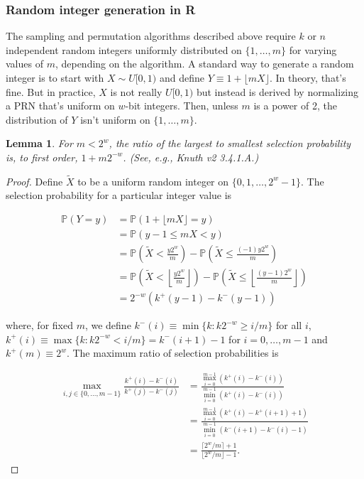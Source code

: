 \documentclass[12pt]{article}
\newtheorem{lemma}[theorem]{Lemma}
\newcommand{\todo}[1]{{\color{red}{TO DO: \sc #1}}}
\newcommand{\pr}{\mathbb{P}} %
\begin{document}
\subsubsection{Random integer generation in R}
The sampling and permutation algorithms described above require $k$ or $n$ independent random integers
uniformly distributed on $\{1, \dots, m\}$ for varying values of $m$, depending on the algorithm.
A standard way to generate a random integer is to start with $X \sim U[0,1)$ and define $Y \equiv 1 + \lfloor mX \rfloor$. 
In theory, that's fine. 
But in practice, $X$ is not really $U[0,1)$ but instead is derived by normalizing a PRN that's uniform on $w$-bit integers. 
Then, unless $m$ is a power of 2, the distribution of $Y$ isn't uniform on $\{1, \ldots, m\}$. 

\begin{lemma}
For $m < 2^w$, the ratio of the largest to smallest selection probability is, to first order,  $1+ m 2^{-w}$. (See, e.g., Knuth v2 3.4.1.A.)
\end{lemma}

\begin{proof}
Define $\tilde{X}$ to be a uniform random integer on $\{0, 1, \dots, 2^w - 1\}$.
The selection probability for a particular integer value is 

\begin{align*}
\pr\left(Y = y\right) &= \pr\left(1 + \lfloor mX \rfloor = y\right) \\
&= \pr\left(y-1 \leq mX < y\right) \\
&= \pr\left(\tilde{X} < \frac{y2^w}{m}\right) - \pr\left(\tilde{X} \leq \frac{(-1)y2^w}{m}\right)\\
&= \pr\left(\tilde{X} < \left\lfloor\frac{y2^w}{m}\right\rfloor\right) - \pr\left(\tilde{X} \leq \left\lfloor\frac{(y-1)2^w}{m}\right\rfloor\right)\\
&= 2^{-w}\left(k^+(y-1)- k^-(y-1)\right)
\end{align*}

\noindent where, for fixed $m$, we define $k^-(i) \equiv \min \{k: k2^{-w} \geq i/m\}$ for all $i$,
$k^+(i) \equiv \max \{k : k2^{-w} < i/m \} = k^-(i+1)-1$ for $i = 0, \dots, m-1$
and $k^+(m) \equiv 2^w$.
The maximum ratio of selection probabilities is 

\begin{align*}
\max_{i, j \in \{0, \ldots, m-1\}} \frac{k^+(i) - k^-(i)}{k^+(j) - k^-(j)}
&= \frac{ \max_{i=0}^{m-1} (k^+(i) - k^-(i))}{\min_{i=0}^{m-1} (k^+(i) - k^-(i))} \\
&= \frac{ \max_{i=0}^{m-1} (k^+(i) - k^+(i+1) + 1)}{\min_{i=0}^{m-1} (k^-(i+1) - k^-(i) - 1)} \\
&= \frac{\lceil 2^w/m \rceil + 1}{\lfloor 2^w/m \rfloor -1}.
\end{align*}
\end{proof}
\todo{is this proof right? seems wrong}
\end{document}
